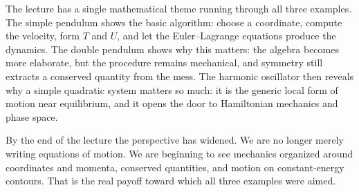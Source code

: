 The lecture has a single mathematical theme running through all three examples. The simple pendulum shows the basic algorithm: choose a coordinate, compute the velocity, form \(T\) and \(U\), and let the Euler--Lagrange equations produce the dynamics. The double pendulum shows why this matters: the algebra becomes more elaborate, but the procedure remains mechanical, and symmetry still extracts a conserved quantity from the mess. The harmonic oscillator then reveals why a simple quadratic system matters so much: it is the generic local form of motion near equilibrium, and it opens the door to Hamiltonian mechanics and phase space.

By the end of the lecture the perspective has widened. We are no longer merely writing equations of motion. We are beginning to see mechanics organized around coordinates and momenta, conserved quantities, and motion on constant-energy contours. That is the real payoff toward which all three examples were aimed.